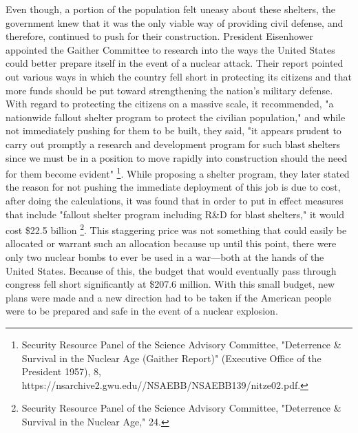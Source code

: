 \documentclass[12pt]{turabian-researchpaper}
\begin{document}
Even though, a portion of the population felt uneasy about these shelters, the government knew that it was the only viable way of providing civil defense, and therefore, continued to push for their construction. President Eisenhower appointed the Gaither Committee to research into the ways the United States could better prepare itself in the event of a nuclear attack. Their report pointed out various ways in which the country fell short in protecting its citizens and that more funds should be put toward strengthening the nation's military defense. With regard to protecting the citizens on a massive scale, it recommended, "a nationwide fallout shelter program to protect the civilian population," and while not immediately pushing for them to be built, they said, "it appears prudent to carry out promptly a research and development program for such blast shelters since we must be in a position to move rapidly into construction should the need for them become evident" \footnote{Security Resource Panel of the Science Advisory Committee, "Deterrence \& Survival in the Nuclear Age (Gaither Report)" (Executive Office of the President 1957), 8, https://nsarchive2.gwu.edu//NSAEBB/NSAEBB139/nitze02.pdf.}. While proposing a shelter program, they later stated the reason for not pushing the immediate deployment of this job is due to cost, after doing the calculations, it was found that in order to put in effect measures that include "fallout shelter program including R\&D for blast shelters," it would cost \$22.5 billion \footnote{Security Resource Panel of the Science Advisory Committee, "Deterrence \& Survival in the Nuclear Age," 24.}. This staggering price was not something that could easily be allocated or warrant such an allocation because up until this point, there were only two nuclear bombs to ever be used in a war—both at the hands of the United States. Because of this, the budget that would eventually pass through congress fell short significantly at \$207.6 million. With this small budget, new plans were made and a new direction had to be taken if the American people were to be prepared and safe in the event of a nuclear explosion.
\end{document}
